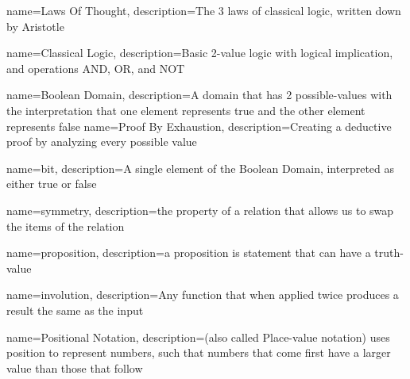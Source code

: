 {
    name={Laws Of Thought},
    description={The 3 laws of classical logic, written down by Aristotle}
}

{
	name={Classical Logic},
    description={Basic 2-value logic with logical implication, and operations AND, OR, and NOT}
}

{
    name={Boolean Domain},
    description={A domain that has 2 possible-values with the interpretation that one element represents true and the other element represents false}
}
{
    name={Proof By Exhaustion},
    description={Creating a deductive proof by analyzing every possible value}
}

{
    name={bit},
    description={A single element of the Boolean Domain, interpreted as either true or false}
}

{
    name={symmetry},
    description={the property of a relation that allows us to swap the items of the relation}
}

{
    name={proposition},
    description={a proposition is statement that can have a truth-value}
}

{
    name={involution},
    description={Any function that when applied twice produces a result the same as the input}
}

{
    name={Positional Notation},
    description={(also called Place-value notation) uses position to represent numbers, such that numbers that come first have a larger value than those that follow}
}